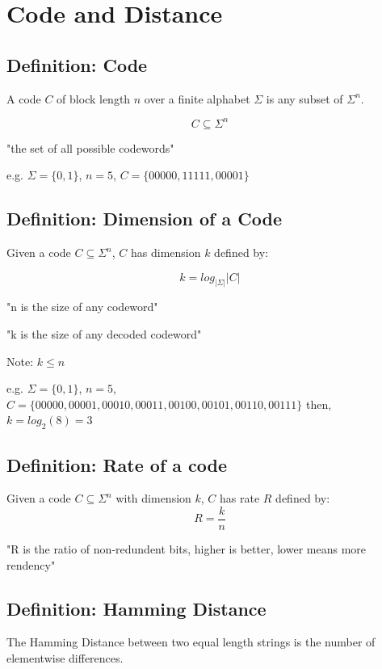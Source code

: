 \documentclass[12pt]{article}
\begin{document}
\section{Code and Distance}

\subsection{Definition: Code}
A code $C$ of block length $n$ over a finite alphabet $\Sigma$ is any subset of $\Sigma^n$.

$$ C \subseteq \Sigma^n$$

\begin{center}
  "the set of all possible codewords"
\end{center}

e.g. $\Sigma = \{0,1\}$, $n=5$, $C = \{00000, 11111, 00001\}$

\subsection{Definition: Dimension of a Code}
Given a code $C \subseteq \Sigma^n$, $C$ has dimension $k$ defined by:

$$ k = log_{\lvert \Sigma \rvert} \lvert C \rvert $$

\begin{center}
  "n is the size of any codeword"
\end{center}
\begin{center}
  "k is the size of any decoded codeword"
\end{center}

Note: $k \leq n$

e.g. $\Sigma = \{0,1\}$, $n=5$, $C = \{00000, 00001, 00010, 00011, 00100, 00101, 00110, 00111\}$ then, $ k = log_2 (8) = 3$

\subsection{Definition: Rate of a code}
Given a code $C \subseteq \Sigma^n$ with dimension $k$, $C$ has rate $R$ defined by:
$$ R = \frac{k}{n}$$

\begin{center}
  "R is the ratio of non-redundent bits, higher is better, lower means more rendency"
\end{center}


\subsection{Definition: Hamming Distance}
The Hamming Distance between two equal length strings is the number of elementwise differences.
\end{document}
